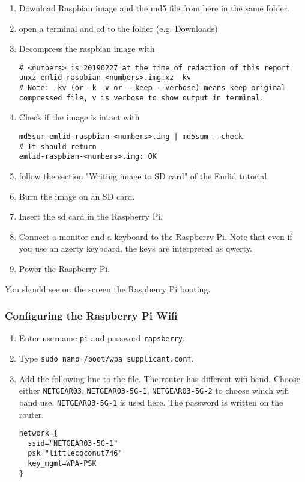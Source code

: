 \begin{enumerate}
    \item Download Raspbian image and the md5 file from here \cite{emlid_rpi_config} in the same folder.
    \item open a terminal and cd to the folder (e.g. Downloads)
    \item Decompress the raspbian image with

          \begin{verbatim}
# <numbers> is 20190227 at the time of redaction of this report
unxz emlid-raspbian-<numbers>.img.xz -kv
# Note: -kv (or -k -v or --keep --verbose) means keep original compressed file, v is verbose to show output in terminal.
                    \end{verbatim}

    \item Check if the image is intact with

          \begin{verbatim}
md5sum emlid-raspbian-<numbers>.img | md5sum --check
# It should return
emlid-raspbian-<numbers>.img: OK
                    \end{verbatim}

    \item follow the section "Writing image to SD card" of the Emlid tutorial
    \item Burn the image on an SD card.
    \item Insert the sd card in the Raspberry Pi.
    \item Connect a monitor and a keyboard to the Raspberry Pi. Note that even if you use an azerty keyboard, the keys are interpreted as qwerty.
    \item Power the Raspberry Pi.
\end{enumerate}
You should see on the screen the Raspberry Pi booting.

\subsubsection{Configuring the Raspberry Pi Wifi}

\begin{enumerate}
    \item Enter username \texttt{pi} and password \texttt{rapsberry}.
    \item Type \texttt{sudo nano /boot/wpa\_supplicant.conf}.
    \item Add the following line to the file. The router has different wifi band. Choose either \texttt{NETGEAR03}, \texttt{NETGEAR03-5G-1}, \texttt{NETGEAR03-5G-2} to choose which wifi band use. \texttt{NETGEAR03-5G-1} is used here. The password is written on the router.

          \begin{verbatim}
network={
  ssid="NETGEAR03-5G-1"
  psk="littlecoconut746"
  key_mgmt=WPA-PSK
}
                    \end{verbatim}
\end{enumerate}

